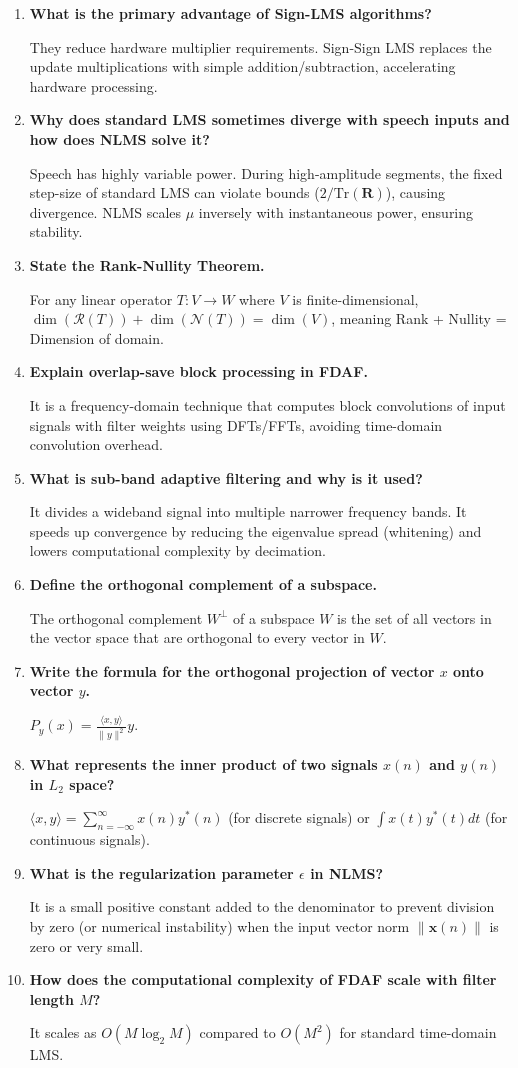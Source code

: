 \documentclass[12pt,a4paper]{article}
\newcommand{\Q}[1]{\textbf{#1}\par\noindent\ignorespaces}
\begin{document}
\begin{tcolorbox}[exambox, title={\textbf{Frequently Asked / Viva Questions}}]
\begin{enumerate}[topsep=0pt, label=\textbf{Q\arabic*.}, itemsep=5pt]
  \item \Q{What is the primary advantage of Sign-LMS algorithms?}
    They reduce hardware multiplier requirements. Sign-Sign LMS replaces the update multiplications with simple addition/subtraction, accelerating hardware processing.
  \item \Q{Why does standard LMS sometimes diverge with speech inputs and how does NLMS solve it?}
    Speech has highly variable power. During high-amplitude segments, the fixed step-size of standard LMS can violate bounds ($2/\text{Tr}(\mathbf{R})$), causing divergence. NLMS scales $\mu$ inversely with instantaneous power, ensuring stability.
  \item \Q{State the Rank-Nullity Theorem.}
    For any linear operator $T: V \to W$ where $V$ is finite-dimensional, $\dim(\mathcal{R}(T)) + \dim(\mathcal{N}(T)) = \dim(V)$, meaning Rank + Nullity = Dimension of domain.
  \item \Q{Explain overlap-save block processing in FDAF.}
    It is a frequency-domain technique that computes block convolutions of input signals with filter weights using DFTs/FFTs, avoiding time-domain convolution overhead.
  \item \Q{What is sub-band adaptive filtering and why is it used?}
    It divides a wideband signal into multiple narrower frequency bands. It speeds up convergence by reducing the eigenvalue spread (whitening) and lowers computational complexity by decimation.
  \item \Q{Define the orthogonal complement of a subspace.}
    The orthogonal complement $W^\perp$ of a subspace $W$ is the set of all vectors in the vector space that are orthogonal to every vector in $W$.
  \item \Q{Write the formula for the orthogonal projection of vector $x$ onto vector $y$.}
    $P_y(x) = \frac{\langle x, y \rangle}{\|y\|^2} y$.
  \item \Q{What represents the inner product of two signals $x(n)$ and $y(n)$ in $L_2$ space?}
    $\langle x, y \rangle = \sum_{n=-\infty}^\infty x(n) y^*(n)$ (for discrete signals) or $\int x(t) y^*(t) dt$ (for continuous signals).
  \item \Q{What is the regularization parameter $\epsilon$ in NLMS?}
    It is a small positive constant added to the denominator to prevent division by zero (or numerical instability) when the input vector norm $\|\mathbf{x}(n)\|$ is zero or very small.
  \item \Q{How does the computational complexity of FDAF scale with filter length $M$?}
    It scales as $O(M \log_2 M)$ compared to $O(M^2)$ for standard time-domain LMS.
\end{enumerate}
\end{tcolorbox}
\end{document}
